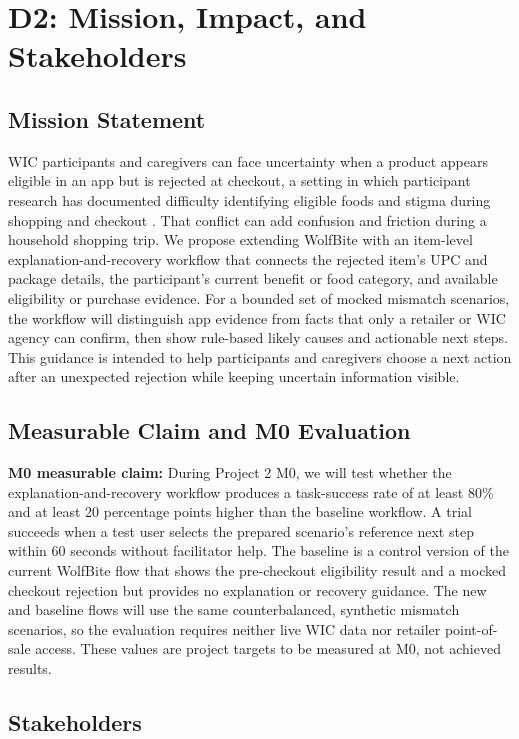 \documentclass[sigconf]{acmart}
\begin{document}
\section{D2: Mission, Impact, and Stakeholders}

\subsection{Mission Statement}

WIC participants and caregivers can face uncertainty when a product appears
eligible in an app but is rejected at checkout, a setting in which participant
research has documented difficulty identifying eligible foods and stigma
during shopping and checkout \cite{fiedler2026,chauvenet2019}. That conflict
can add confusion and friction during a household shopping trip. We propose
extending WolfBite with an item-level explanation-and-recovery workflow that
connects the rejected item's UPC and package details, the participant's current
benefit or food category, and available eligibility or purchase evidence. For
a bounded set of mocked mismatch scenarios, the workflow will distinguish app
evidence from facts that only a retailer or WIC agency can confirm, then show
rule-based likely causes and actionable next steps. This guidance is intended
to help participants and caregivers choose a next action after an unexpected
rejection while keeping uncertain information visible.

\subsection{Measurable Claim and M0 Evaluation}

\textbf{M0 measurable claim:} During Project 2 M0, we will test whether the
explanation-and-recovery workflow produces a task-success rate of at least
80\% and at least 20 percentage points higher than the baseline workflow. A
trial succeeds when a test user selects the prepared scenario's reference next
step within 60 seconds without facilitator help. The baseline is a control
version of the current WolfBite flow that shows the pre-checkout eligibility
result and a mocked checkout rejection but provides no explanation or recovery
guidance. The new and baseline flows will use the same counterbalanced,
synthetic mismatch scenarios, so the evaluation requires neither live WIC
data nor retailer point-of-sale access. These values are project targets to be
measured at M0, not achieved results.

\subsection{Stakeholders}
\end{document}
